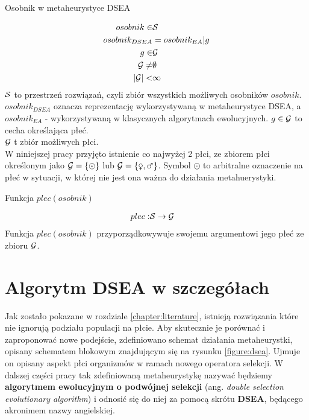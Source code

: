 \documentclass[./FM_mgr.tex]{subfiles}
\begin{document}
\begin{signature}
	\caption{Osobnik w metaheurystyce DSEA \label{signature:specimen_dsea}}
	\begin{align}
		osobnik  \in &\mathcal{S} \\
		osobnik_{DSEA} &= osobnik_{EA} | g \\
		g \in &\mathcal{G} \\
		\mathcal{G} \neq & \emptyset \\
		|\mathcal{G}| < &\infty
	\end{align}	
	$\mathcal{S}$ to przestrzeń rozwiązań, czyli zbiór wszystkich możliwych osobników $osobnik$.
	$osobnik_{DSEA}$ oznacza reprezentację wykorzystywaną w metaheurystyce DSEA, a $osobnik_{EA}$ - wykorzystywaną w klasycznych algorytmach ewolucyjnych. $g \in \mathcal{G}$ to cecha określająca płeć. \\
	$\mathcal{G}$ t zbiór możliwych płci.\\
	W niniejszej pracy przyjęto istnienie co najwyżej 2 płci, ze zbiorem płci określonym jako $\mathcal{G} = \{ \odot \}$ lub $\important{G} = \{ \female, \male \}$. Symbol $\odot$ to arbitralne oznaczenie na płeć w sytuacji, w której nie jest ona ważna do działania metahuerystyki.
\end{signature}

\begin{signature}
	\caption{Funkcja $plec(osobnik)$ \label{signature:genderFoo}}
	\begin{align}
	plec: & \mathcal{S} \rightarrow \mathcal{G}
	\end{align}
	Funkcja $plec(osobnik)$ przyporządkowywuje swojemu argumentowi jego płeć ze zbioru $\mathcal{G}$.
\end{signature}

\newpage

\section{Algorytm DSEA w szczegółach} \label{section:dsea}

Jak zostało pokazane w rozdziale \ref{chapter:literature}, istnieją rozwiązania które nie ignorują podziału populacji na płcie. 
Aby skutecznie je porównać i zaproponować nowe podejście, zdefiniowano schemat działania metaheurystki, opisany schematem blokowym znajdującym się na rysunku \ref{figure:dsea}. Ujmuje on opisany aspekt płci organizmów w ramach nowego operatora selekcji. 
W dalszej części pracy tak zdefiniowaną metaheurystykę nazywać będziemy \textbf{algorytmem ewolucyjnym o podwójnej selekcji} (ang. \emph{double selection evolutionary algorithm}) i odnosić się do niej za pomocą skrótu \textbf{DSEA}, będącego akronimem nazwy angielskiej.
\end{document}
